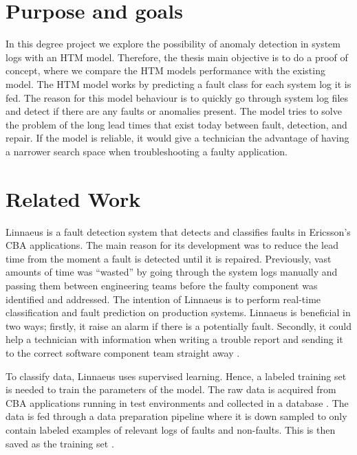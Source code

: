 \section{Purpose and goals}
In this degree project we explore the possibility of anomaly detection in system logs with an HTM model. Therefore, the thesis main objective is to do a proof of concept, where we compare the HTM models performance with the existing model. The HTM model works by predicting a fault class for each system log it is fed. The reason for this model behaviour is to quickly go through system log files and detect if there are any faults or anomalies present. The model tries to solve the problem of the long lead times that exist today between fault, detection, and repair. If the model is reliable, it would give a technician the advantage of having a narrower search space when troubleshooting a faulty application.


\section{Related Work}
Linnaeus is a fault detection system that detects and classifies faults in Ericsson's CBA applications. The main reason for its development was to reduce the lead time from the moment a fault is detected until it is repaired. Previously, vast amounts of time was ``wasted'' by going through the system logs manually and passing them between engineering teams before the faulty component was identified and addressed. The intention of Linnaeus is to perform real-time classification and fault prediction on production systems. Linnaeus is beneficial in two ways; firstly, it raise an alarm if there is a potentially fault. Secondly, it could help a technician with information when writing a trouble report and sending it to the correct software component team straight away \cite{linnaeus}.


To classify data, Linnaeus uses supervised learning. Hence, a labeled training set is needed to train the parameters of the model. The raw data is acquired from CBA applications running in test environments and collected in a database \cite{linnaeus}. The data is fed through a data preparation pipeline where it is down sampled to only contain labeled examples of relevant logs of faults and non-faults. This is then saved as the training set \cite{linnaeus}.


